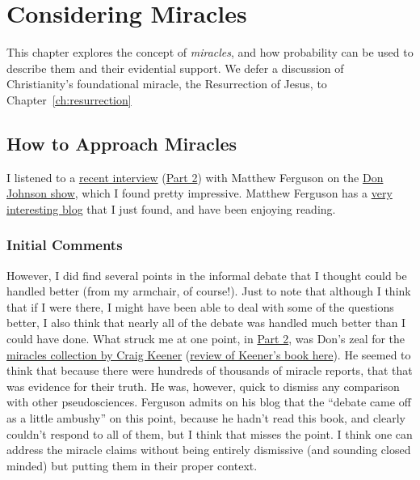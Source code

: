 \chapter{Considering Miracles}\label{ch:miracles}

This chapter explores the concept of {\em miracles}, and how probability can be used to describe them and their evidential support.  We defer a discussion of Christianity's foundational miracle, the Resurrection of Jesus, to Chapter~\ref{ch:resurrection}

\section{How to Approach Miracles}

I listened to a
\href{http://donjohnsonministries.org/discussion-with-naturalist-matthew-ferguson-part-1/}{recent
interview}
(\href{http://donjohnsonministries.org/discussion-with-naturalist-matthew-ferguson-part-2/)}{Part
2}) with Matthew Ferguson on the
\href{http://donjohnsonministries.org/}{Don Johnson show}, which I found
pretty impressive. Matthew Ferguson has a
\href{http://adversusapologetica.wordpress.com/}{very interesting blog}
that I just found, and have been enjoying reading.

\subsection{Initial Comments}\label{pandoc-initial-comments}

However, I did find several points in the informal debate that I thought
could be handled better (from my armchair, of course!). Just to note
that although I think that if I were there, I might have been able to
deal with some of the questions better, I also think that nearly all of
the debate was handled much better than I could have done. What struck
me at one point, in
\href{http://donjohnsonministries.org/discussion-with-naturalist-matthew-ferguson-part-2/)}{Part
2}, was Don's zeal for the
\href{http://www.amazon.com/Miracles-Credibility-New-Testament-Accounts/dp/0801039525}{miracles
collection by Craig Keener}
(\href{http://www.uncrediblehallq.net/2012/01/0shou5/review-of-craig-keeners-miracles/)}{review
of Keener's book here}). He seemed to think that because there were
hundreds of thousands of miracle reports, that that was evidence for
their truth. He was, however, quick to dismiss any comparison with other
pseudosciences. Ferguson admits on his blog that the ``debate came off
as a little ambushy'' on this point, because he hadn't read this book,
and clearly couldn't respond to all of them, but I think that misses the
point. I think one can address the miracle claims without being entirely
dismissive (and sounding closed minded) but putting them in their proper
context.

